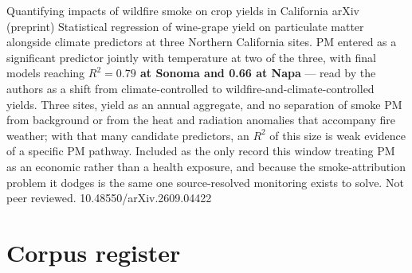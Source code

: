 \documentclass[10pt]{article}
\begin{document}
{Quantifying impacts of wildfire smoke on crop yields in California}
{arXiv (preprint)}
{Statistical regression of wine-grape yield on particulate matter alongside climate
predictors at three Northern California sites. PM entered as a significant predictor
jointly with temperature at two of the three, with final models reaching
\textbf{$R^2=0.79$ at Sonoma and 0.66 at Napa} --- read by the authors as a shift from
climate-controlled to wildfire-and-climate-controlled yields. Three sites, yield as an
annual aggregate, and no separation of smoke PM from background or from the heat and
radiation anomalies that accompany fire weather; with that many candidate predictors, an
$R^2$ of this size is weak evidence of a specific PM pathway. Included as the only record
this window treating PM as an economic rather than a health exposure, and because the
smoke-attribution problem it dodges is the same one source-resolved monitoring exists to
solve. Not peer reviewed.}
{10.48550/arXiv.2609.04422}

\section*{\sffamily\bfseries\color{Deep}Corpus register}
\vspace{-1.5mm}{\color{Amber}\rule{\linewidth}{1.1pt}}\vspace{2.5mm}


\end{document}
